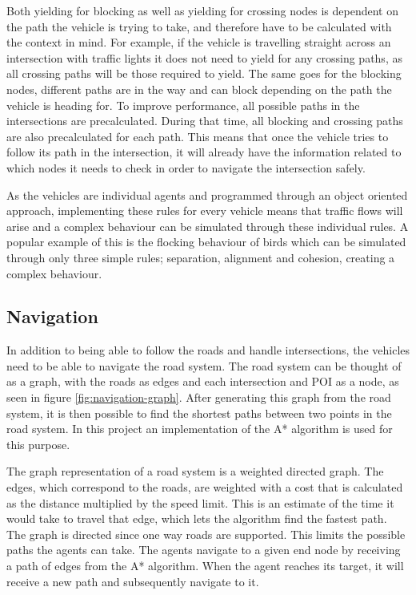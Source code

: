         Both yielding for blocking as well as yielding for crossing nodes is dependent on the path the vehicle is trying to take, and therefore have to be calculated with the context in mind. For example, if the vehicle is travelling straight across an intersection with traffic lights it does not need to yield for any crossing paths, as all crossing paths will be those required to yield. The same goes for the blocking nodes, different paths are in the way and can block depending on the path the vehicle is heading for. To improve performance, all possible paths in the intersections are precalculated. During that time, all blocking and crossing paths are also precalculated for each path. This means that once the vehicle tries to follow its path in the intersection, it will already have the information related to which nodes it needs to check in order to navigate the intersection safely.
    
        As the vehicles are individual agents and programmed through an object oriented approach, implementing these rules for every vehicle means that traffic flows will arise and a complex behaviour can be simulated through these individual rules. A popular example of this is the flocking behaviour of birds which can be simulated through only three simple rules; separation, alignment and cohesion, creating a complex behaviour\cite{flocking-behaviour}.

    \subsection{Navigation}
        In addition to being able to follow the roads and handle intersections, the vehicles need to be able to navigate the road system. The road system can be thought of as a graph, with the roads as edges and each intersection and POI as a node, as seen in figure \ref{fig:navigation-graph}. After generating this graph from the road system, it is then possible to find the shortest paths between two points in the road system. In this project an implementation of the A* algorithm is used for this purpose.
    
        The graph representation of a road system is a weighted directed graph. The edges, which correspond to the roads, are weighted with a cost that is calculated as the distance multiplied by the speed limit. This is an estimate of the time it would take to travel that edge, which lets the algorithm find the fastest path. The graph is directed since one way roads are supported. This limits the possible paths the agents can take. The agents navigate to a given end node by receiving a path of edges from the A* algorithm. When the agent reaches its target, it will receive a new path and subsequently navigate to it.
        

